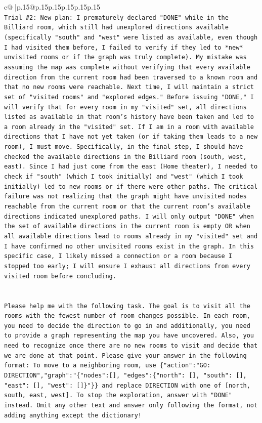 \documentclass{article}
\begin{document}
{\begin{supertabular}{c@{$\;$}|p{.15\linewidth}@{}p{.15\linewidth}p{.15\linewidth}p{.15\linewidth}p{.15\linewidth}p{.15\linewidth}}
{{{\\ 
\texttt{Trial \#2: New plan: I prematurely declared "DONE" while in the Billiard room, which still had unexplored directions available (specifically "south" and "west" were listed as available, even though I had visited them before, I failed to verify if they led to *new* unvisited rooms or if the graph was truly complete). My mistake was assuming the map was complete without verifying that every available direction from the current room had been traversed to a known room and that no new rooms were reachable. Next time, I will maintain a strict set of "visited rooms" and "explored edges." Before issuing "DONE," I will verify that for every room in my "visited" set, all directions listed as available in that room's history have been taken and led to a room already in the "visited" set. If I am in a room with available directions that I have not yet taken (or if taking them leads to a new room), I must move. Specifically, in the final step, I should have checked the available directions in the Billiard room (south, west, east). Since I had just come from the east (Home theater), I needed to check if "south" (which I took initially) and "west" (which I took initially) led to new rooms or if there were other paths. The critical failure was not realizing that the graph might have unvisited nodes reachable from the current room or that the current room's available directions indicated unexplored paths. I will only output "DONE" when the set of available directions in the current room is empty OR when all available directions lead to rooms already in my "visited" set and I have confirmed no other unvisited rooms exist in the graph. In this specific case, I likely missed a connection or a room because I stopped too early; I will ensure I exhaust all directions from every visited room before concluding.} \\
\\ 
\\ 
\texttt{Please help me with the following task. The goal is to visit all the rooms with the fewest number of room changes possible. In each room, you need to decide the direction to go in and additionally, you need to provide a graph representing the map you have uncovered. Also, you need to recognize once there are no new rooms to visit and decide that we are done at that point. Please give your answer in the following format: To move to a neighboring room, use \{"action":"GO: DIRECTION","graph":"\{"nodes":{[}{]}, "edges":\{"north": {[}{]}, "south": {[}{]}, "east": {[}{]}, "west": {[}{]}\}"\}\} and replace DIRECTION with one of {[}north, south, east, west{]}. To stop the exploration, answer with "DONE" instead. Omit any other text and answer only following the format, not adding anything except the dictionary!} \\
}}}
\end{supertabular}}
\end{document}
